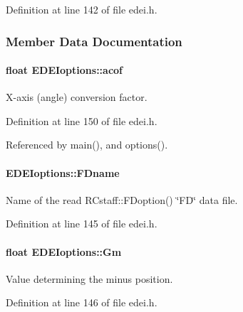 Definition at line 142 of file edei.h.



\subsubsection{Member Data Documentation}
\hypertarget{structEDEIoptions_a6a32d7dfbbb0c5af80dfa73e4bef35f2}{
\paragraph[{acof}]{\setlength{\rightskip}{0pt plus 5cm}float {\bf EDEIoptions::acof}}\hfill}
\label{structEDEIoptions_a6a32d7dfbbb0c5af80dfa73e4bef35f2}


X-\/axis (angle) conversion factor. 



Definition at line 150 of file edei.h.



Referenced by main(), and options().

\hypertarget{structEDEIoptions_a50ffef2f3656fc6b72cbb801d722c4f9}{
\paragraph[{FDname}]{ {\bf EDEIoptions::FDname}}\hfill}
\label{structEDEIoptions_a50ffef2f3656fc6b72cbb801d722c4f9}


Name of the read RCstaff::FDoption() \char`\"{}FD\char`\"{} data file. 



Definition at line 145 of file edei.h.

\hypertarget{structEDEIoptions_a293daefe2fbeb36296107fd1db32640c}{
\paragraph[{Gm}]{\setlength{\rightskip}{0pt plus 5cm}float {\bf EDEIoptions::Gm}}\hfill}
\label{structEDEIoptions_a293daefe2fbeb36296107fd1db32640c}


Value determining the minus position. 



Definition at line 146 of file edei.h.




